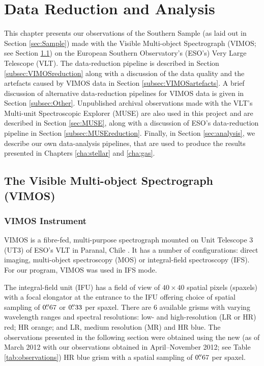 \chapter{Data Reduction and Analysis}
	\label{cha:Data}
This chapter presents our observations of the Southern Sample (as laid out in Section \ref{sec:Sample}) made with the Visible Multi-object Spectrograph (VIMOS; see Section \ref{sec:VIMOS}) on the European Southern Observatory's (ESO's) Very Large Telescope (VLT). The data-reduction pipeline is described in Section \ref{subsec:VIMOSreduction} along with a discussion of the data quality and the artefacts caused by VIMOS data in Section \ref{subsec:VIMOSartefacts}. A brief discussion of alternative data-reduction pipelines for VIMOS data is given in Section \ref{subsec:Other}. Unpublished archival observations made with the VLT's Multi-unit Spectroscopic Explorer (MUSE) are also used in this project and are described in Section \ref{sec:MUSE}, along with a discussion of ESO's data-reduction pipeline in Section \ref{subsec:MUSEreduction}. Finally, in Section \ref{sec:analysis}, we describe our own data-analysis pipelines, that are used to produce the results presented in Chapters \ref{cha:stellar} and \ref{cha:gas}.  

\section[The Visible Multi-object Spectrograph (VIMOS)]{The Visible Multi-object Spectrograph \\(VIMOS)}
	\label{sec:VIMOS}
	\subsection{VIMOS Instrument}
		VIMOS is a fibre-fed, multi-purpose spectrograph mounted on Unit Telescope 3 (UT3) of ESO's VLT in Paranal, Chile \citep{LeFevre2003}. It has a number of configurations: direct imaging, multi-object spectroscopy (MOS) or integral-field spectroscopy (IFS). For our program, VIMOS was used in IFS mode. 

		The integral-field unit (IFU) has a field of view of $40 \times 40$ spatial pixels (spaxels) with a focal elongator at the entrance to the IFU offering choice of spatial sampling of $0 \hbox{$.\!\!^{\prime\prime}$}67$ or $0 \hbox{$.\!\!^{\prime\prime}$}33$ per spaxel. There are 6 available grisms with varying wavelength ranges and spectral resolutions: low- and high-resolution (LR or HR) red; HR orange; and LR, medium resolution (MR) and HR blue. The observations presented in the following section were obtained using the new (as of March 2012 with our observations obtained in April--November 2012; see Table \ref{tab:observations}) HR blue grism with a spatial sampling of $0 \hbox{$.\!\!^{\prime\prime}$}67$ per spaxel. 

